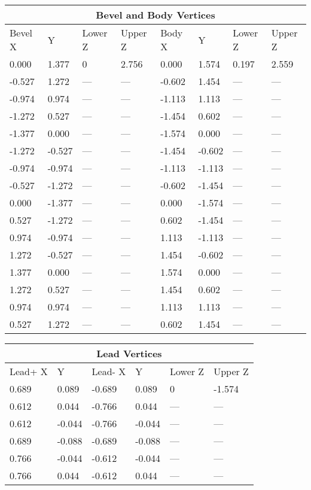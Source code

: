 \documentclass[a4paper, dvipdfm]{article}
\begin{document}
\begin{tabular}{|l|l|l|l||l|l|l|l|}
\hline
\multicolumn{8}{|c|}{\textbf{Bevel and Body Vertices}}\\
\hline
Bevel X & Y & Lower Z & Upper Z & Body X & Y & Lower Z & Upper Z\\
\hline
 0.000 &  1.377 & 0    & 2.756 &  0.000 &  1.574 & 0.197 & 2.559\\
-0.527 &  1.272 & ---  & ---   & -0.602 &  1.454 & ---   & ---\\
-0.974 &  0.974 & ---  & ---   & -1.113 &  1.113 & ---   & ---\\
-1.272 &  0.527 & ---  & ---   & -1.454 &  0.602 & ---   & ---\\
-1.377 &  0.000 & ---  & ---   & -1.574 &  0.000 & ---   & ---\\
-1.272 & -0.527 & ---  & ---   & -1.454 & -0.602 & ---   & ---\\
-0.974 & -0.974 & ---  & ---   & -1.113 & -1.113 & ---   & ---\\
-0.527 & -1.272 & ---  & ---   & -0.602 & -1.454 & ---   & ---\\
 0.000 & -1.377 & ---  & ---   &  0.000 & -1.574 & ---   & ---\\
 0.527 & -1.272 & ---  & ---   &  0.602 & -1.454 & ---   & ---\\
 0.974 & -0.974 & ---  & ---   &  1.113 & -1.113 & ---   & ---\\
 1.272 & -0.527 & ---  & ---   &  1.454 & -0.602 & ---   & ---\\
 1.377 &  0.000 & ---  & ---   &  1.574 &  0.000 & ---   & ---\\
 1.272 &  0.527 & ---  & ---   &  1.454 &  0.602 & ---   & ---\\
 0.974 &  0.974 & ---  & ---   &  1.113 &  1.113 & ---   & ---\\
 0.527 &  1.272 & ---  & ---   &  0.602 &  1.454 & ---   & ---\\
\hline
\end{tabular}


\begin{tabular}{|l|l||l|l||l|l|}
\hline
\multicolumn{6}{|c|}{\textbf{Lead Vertices}}\\
\hline
Lead+ X & Y & Lead- X & Y & Lower Z & Upper Z\\
\hline
0.689 &  0.089 & -0.689 &  0.089 & 0   & -1.574\\
0.612 &  0.044 & -0.766 &  0.044 & --- & ---\\
0.612 & -0.044 & -0.766 & -0.044 & --- & ---\\
0.689 & -0.088 & -0.689 & -0.088 & --- & ---\\
0.766 & -0.044 & -0.612 & -0.044 & --- & ---\\
0.766 &  0.044 & -0.612 &  0.044 & --- & ---\\
\hline
\end{tabular}
\end{document}
